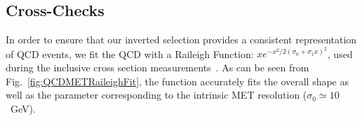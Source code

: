 \subsection{Cross-Checks}

In order to ensure that our inverted selection provides a consistent representation of
QCD events, 
we fit the QCD with a Raileigh Function: $xe^{-x^2/2(\sigma_0+\sigma_1x)^2}$,
used during the inclusive cross section measurements~\cite{WZCMS:2010}. 
As can be seen from Fig.~\ref{fig:QCDMETRaileighFit},
the function accurately fits the overall shape as well as the parameter
corresponding to the intrinsic MET resolution ($\sigma_0\simeq 10$~GeV).




